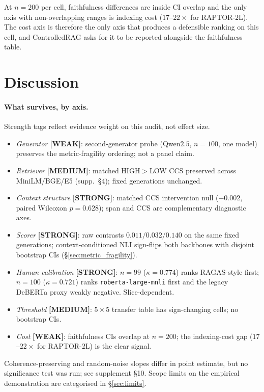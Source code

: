 At $n=200$ per cell, faithfulness differences are inside CI overlap
and the only axis with non-overlapping ranges is indexing cost
($17$--$22\times$ for RAPTOR-$2$L). The cost axis is therefore the
only axis that produces a defensible ranking on this cell, and
ControlledRAG asks for it to be reported alongside the faithfulness
table.

\section{Discussion}
\label{sec:discussion}

\paragraph{What survives, by axis.} Strength tags reflect evidence
weight on this audit, not effect size.
\begin{itemize}\setlength{\itemsep}{0pt}\setlength{\parsep}{0pt}\setlength{\topsep}{2pt}
\item \emph{Generator} \textbf{[WEAK]}: second-generator probe
  (Qwen$2.5$, $n=100$, one model) preserves the metric-fragility
  ordering; not a panel claim.
\item \emph{Retriever} \textbf{[MEDIUM]}: matched HIGH$>$LOW CCS
  preserved across MiniLM/BGE/E5 (supp.\ \S 4); fixed generations
  unchanged.
\item \emph{Context structure} \textbf{[STRONG]}: matched CCS
  intervention null ($-0.002$, paired Wilcoxon $p=0.628$); span and
  CCS are complementary diagnostic axes.
\item \emph{Scorer} \textbf{[STRONG]}: raw contrasts
  $0.011 / 0.032 / 0.140$ on the same fixed generations;
  context-conditioned NLI sign-flips both backbones with disjoint
  bootstrap CIs (\S\ref{sec:metric_fragility}).
\item \emph{Human calibration} \textbf{[STRONG]}:
  $n=99$ ($\kappa=0.774$) ranks RAGAS-style first;
  $n=100$ ($\kappa=0.721$) ranks \texttt{roberta-large-mnli} first
  and the legacy DeBERTa proxy weakly negative. Slice-dependent.
\item \emph{Threshold} \textbf{[MEDIUM]}: $5{\times}5$ transfer
  table has sign-changing cells; no bootstrap CIs.
\item \emph{Cost} \textbf{[WEAK]}: faithfulness CIs overlap at
  $n=200$; the indexing-cost gap ($17$--$22\times$ for RAPTOR-$2$L)
  is the clear signal.
\end{itemize}
Coherence-preserving and random-noise slopes differ in point
estimate, but no significance test was run; see supplement
\S 10. Scope limits on the empirical demonstration are
categorised in \S\ref{sec:limits}.

